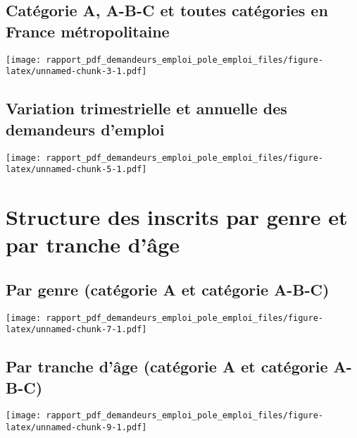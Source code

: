 \documentclass[
  paper=a4,
  ,captions=tableheading
]{scrartcl}
\begin{document}
\hypertarget{catuxe9gorie-a-a-b-c-et-toutes-catuxe9gories-en-france-muxe9tropolitaine}{%
\subsection{Catégorie A, A-B-C et toutes catégories en France
métropolitaine}\label{catuxe9gorie-a-a-b-c-et-toutes-catuxe9gories-en-france-muxe9tropolitaine}}

\texttt{[image: rapport\_pdf\_demandeurs\_emploi\_pole\_emploi\_files/figure-latex/unnamed-chunk-3-1.pdf]}

\hypertarget{variation-trimestrielle-et-annuelle-des-demandeurs-demploi}{%
\subsection{Variation trimestrielle et annuelle des demandeurs
d'emploi}\label{variation-trimestrielle-et-annuelle-des-demandeurs-demploi}}

\texttt{[image: rapport\_pdf\_demandeurs\_emploi\_pole\_emploi\_files/figure-latex/unnamed-chunk-5-1.pdf]}

\hypertarget{structure-des-inscrits-par-genre-et-par-tranche-duxe2ge}{%
\section{Structure des inscrits par genre et par tranche
d'âge}\label{structure-des-inscrits-par-genre-et-par-tranche-duxe2ge}}

\hypertarget{par-genre-catuxe9gorie-a-et-catuxe9gorie-a-b-c}{%
\subsection{Par genre (catégorie A et catégorie
A-B-C)}\label{par-genre-catuxe9gorie-a-et-catuxe9gorie-a-b-c}}

\texttt{[image: rapport\_pdf\_demandeurs\_emploi\_pole\_emploi\_files/figure-latex/unnamed-chunk-7-1.pdf]}

\hypertarget{par-tranche-duxe2ge-catuxe9gorie-a-et-catuxe9gorie-a-b-c}{%
\subsection{Par tranche d'âge (catégorie A et catégorie
A-B-C)}\label{par-tranche-duxe2ge-catuxe9gorie-a-et-catuxe9gorie-a-b-c}}

\texttt{[image: rapport\_pdf\_demandeurs\_emploi\_pole\_emploi\_files/figure-latex/unnamed-chunk-9-1.pdf]}
\end{document}
